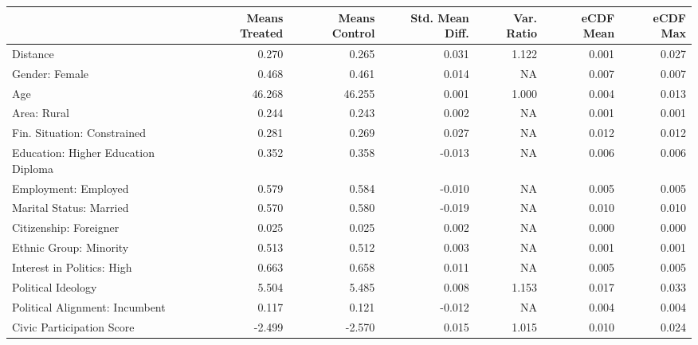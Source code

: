 \begin{table}
\centering
\begin{tabular}[t]{l|r|r|r|r|r|r}
\hline
  & Means Treated & Means Control & Std. Mean Diff. & Var. Ratio & eCDF Mean & eCDF Max\\
\hline
Distance & 0.270 & 0.265 & 0.031 & 1.122 & 0.001 & 0.027\\
\hline
Gender: Female & 0.468 & 0.461 & 0.014 & NA & 0.007 & 0.007\\
\hline
Age & 46.268 & 46.255 & 0.001 & 1.000 & 0.004 & 0.013\\
\hline
Area: Rural & 0.244 & 0.243 & 0.002 & NA & 0.001 & 0.001\\
\hline
Fin. Situation: Constrained & 0.281 & 0.269 & 0.027 & NA & 0.012 & 0.012\\
\hline
Education: Higher Education Diploma & 0.352 & 0.358 & -0.013 & NA & 0.006 & 0.006\\
\hline
Employment: Employed & 0.579 & 0.584 & -0.010 & NA & 0.005 & 0.005\\
\hline
Marital Status: Married & 0.570 & 0.580 & -0.019 & NA & 0.010 & 0.010\\
\hline
Citizenship: Foreigner & 0.025 & 0.025 & 0.002 & NA & 0.000 & 0.000\\
\hline
Ethnic Group: Minority & 0.513 & 0.512 & 0.003 & NA & 0.001 & 0.001\\
\hline
Interest in Politics: High & 0.663 & 0.658 & 0.011 & NA & 0.005 & 0.005\\
\hline
Political Ideology & 5.504 & 5.485 & 0.008 & 1.153 & 0.017 & 0.033\\
\hline
Political Alignment: Incumbent & 0.117 & 0.121 & -0.012 & NA & 0.004 & 0.004\\
\hline
Civic Participation Score & -2.499 & -2.570 & 0.015 & 1.015 & 0.010 & 0.024\\
\hline
\end{tabular}
\end{table}
